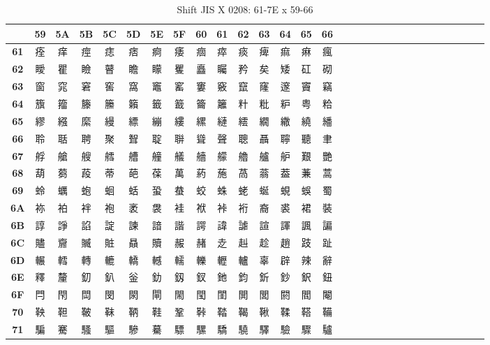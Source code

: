 \begin{table}[H]
\centering
\caption{Shift JIS X 0208: 61-7E x 59-66}
\begin{tabular}{|Sc|Sc|Sc|Sc|Sc|Sc|Sc|Sc|Sc|Sc|Sc|Sc|Sc|Sc|Sc|}
\hline
 & \textbf{59} & \textbf{5A} & \textbf{5B} & \textbf{5C} & \textbf{5D} & \textbf{5E} & \textbf{5F} & \textbf{60} & \textbf{61} & \textbf{62} & \textbf{63} & \textbf{64} & \textbf{65} & \textbf{66} \\ \hline
\textbf{61} & 痊 & 痒 & 痙 & 痣 & 痞 & 痾 & 痿 & 痼 & 瘁 & 痰 & 痺 & 痲 & 痳 & 瘋 \\ \hline
\textbf{62} & 瞹 & 瞿 & 瞼 & 瞽 & 瞻 & 矇 & 矍 & 矗 & 矚 & 矜 & 矣 & 矮 & 矼 & 砌 \\ \hline
\textbf{63} & 窗 & 窕 & 窘 & 窖 & 窩 & 竈 & 窰 & 窶 & 竅 & 竄 & 窿 & 邃 & 竇 & 竊 \\ \hline
\textbf{64} & 籏 & 籀 & 籐 & 籘 & 籟 & 籤 & 籖 & 籥 & 籬 & 籵 & 粃 & 粐 & 粤 & 粭 \\ \hline
\textbf{65} & 繆 & 繦 & 縻 & 縵 & 縹 & 繃 & 縷 & 縲 & 縺 & 繧 & 繝 & 繖 & 繞 & 繙 \\ \hline
\textbf{66} & 聆 & 聒 & 聘 & 聚 & 聟 & 聢 & 聨 & 聳 & 聲 & 聰 & 聶 & 聹 & 聽 & 聿 \\ \hline
\textbf{67} & 艀 & 艙 & 艘 & 艝 & 艚 & 艟 & 艤 & 艢 & 艨 & 艪 & 艫 & 舮 & 艱 & 艷 \\ \hline
\textbf{68} & 葫 & 蒭 & 葮 & 蒂 & 葩 & 葆 & 萬 & 葯 & 葹 & 萵 & 蓊 & 葢 & 蒹 & 蒿 \\ \hline
\textbf{69} & 蛉 & 蠣 & 蚫 & 蛔 & 蛞 & 蛩 & 蛬 & 蛟 & 蛛 & 蛯 & 蜒 & 蜆 & 蜈 & 蜀 \\ \hline
\textbf{6A} & 袮 & 袙 & 袢 & 袍 & 袤 & 袰 & 袿 & 袱 & 裃 & 裄 & 裔 & 裘 & 裙 & 裝 \\ \hline
\textbf{6B} & 諄 & 諍 & 諂 & 諚 & 諫 & 諳 & 諧 & 諤 & 諱 & 謔 & 諠 & 諢 & 諷 & 諞 \\ \hline
\textbf{6C} & 贐 & 齎 & 贓 & 賍 & 贔 & 贖 & 赧 & 赭 & 赱 & 赳 & 趁 & 趙 & 跂 & 趾 \\ \hline
\textbf{6D} & 輾 & 轌 & 轉 & 轆 & 轎 & 轗 & 轜 & 轢 & 轣 & 轤 & 辜 & 辟 & 辣 & 辭 \\ \hline
\textbf{6E} & 釋 & 釐 & 釖 & 釟 & 釡 & 釛 & 釼 & 釵 & 釶 & 鈞 & 釿 & 鈔 & 鈬 & 鈕 \\ \hline
\textbf{6F} & 閂 & 閇 & 閊 & 閔 & 閖 & 閘 & 閙 & 閠 & 閨 & 閧 & 閭 & 閼 & 閻 & 閹 \\ \hline
\textbf{70} & 鞅 & 靼 & 鞁 & 靺 & 鞆 & 鞋 & 鞏 & 鞐 & 鞜 & 鞨 & 鞦 & 鞣 & 鞳 & 鞴 \\ \hline
\textbf{71} & 騙 & 騫 & 騷 & 驅 & 驂 & 驀 & 驃 & 騾 & 驕 & 驍 & 驛 & 驗 & 驟 & 驢 \\ \hline

\end{tabular}
\end{table}
